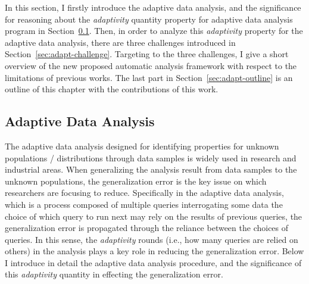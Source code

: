 In this section, 
I firstly introduce the adaptive data analysis, and the
significance for reasoning about the \emph{adaptivity} quantity property 
for adaptive data analysis program in Section~\ref{sec:adapt-background}.
Then, in order to analyze this \emph{adaptivity} property for the adaptive data analysis,
there are three challenges
introduced in Section~\ref{sec:adapt-challenge}.
Targeting to the three challenges, I give a short overview of the new proposed automatic analysis framework with respect to
the limitations of previous works.
The last part in Section~\ref{sec:adapt-outline} is an outline of this chapter with the contributions of this work.

 \subsection{Adaptive Data Analysis}
 \label{sec:adapt-background}
 The adaptive data analysis designed for identifying  properties for unknown populations / distributions 
 through data samples is widely 
 used in research and industrial areas.
 When generalizing the analysis result from data samples to the unknown populations, 
 the generalization error is the key issue on which researchers are focusing to reduce.
 Specifically in the adaptive data analysis,
 which is a process composed of 
 multiple queries interrogating some data
 the choice of which query to run next may rely on the results of previous queries,
 the generalization error is propagated through the reliance between the choices of queries.
 In this sense, the \emph{adaptivity} rounds (i.e., how many queries are relied on others) in the analysis plays a key role in reducing the generalization error.
 Below I introduce in detail the adaptive data analysis procedure,
 and the significance of this \emph{adaptivity} quantity in effecting the generalization error.
 
